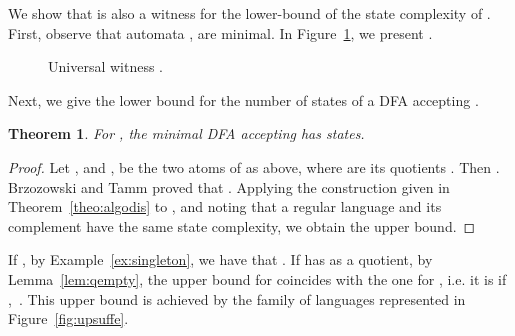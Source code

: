 \documentclass{article}
\newtheorem{theorem}{Theorem}
\newcommand{\dfa}{DFA\xspace}
\begin{document}
We show that  is also a witness for the lower-bound of the state
complexity of . 
First, observe that automata ,  are minimal. 
In Figure~\ref{fig:univ}, we present .

\begin{figure}[h!]
\begin{center}
 \end{center}
\caption{Universal witness .} 
\label{fig:univ} 
\end{figure}
Next, we give the lower bound for the number of states of a 
\dfa accepting .
\begin{theorem}
    \label{theo:scdisttight}
For , the minimal \dfa accepting  has  states.
\end{theorem}
\begin{proof}
  Let , and 
, 
be the two atoms of  as above, where  are its quotients . 
Then .  
Brzozowski and Tamm proved that
  . 
Applying the construction given
  in Theorem~\ref{theo:algodis} to , and noting that a regular language
  and its complement have the same state complexity, we obtain the upper
  bound.
\end{proof}

If , by Example~\ref{ex:singleton}, we have that . If  has  as a quotient, by Lemma~\ref{lem:qempty},  the upper bound for  coincides with the one for , i.e. it is  if ,~\cite{brzozowski14:_quotien_compl_of_closed_languag}. This upper bound is achieved by the family of languages represented in Figure~\ref{fig:upsuffe}.
\end{document}
